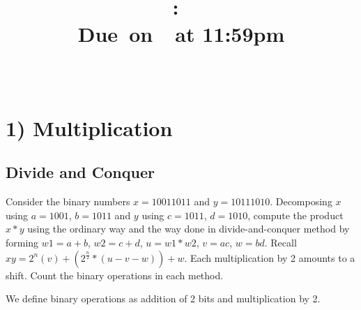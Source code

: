\documentclass{article}
\title{
    \vspace{2in}
    \textmd{\textbf{\hmwkClass:\ \hmwkTitle}}\\
    \normalsize\vspace{0.1in}\small{Due\ on\ \hmwkDueDate\ at 11:59pm}\\
    \vspace{0.1in}\large{\textit{\hmwkClassInstructor\ \hmwkClassTime}}
    \vspace{3in}
}
\author{\hmwkAuthorName}
\date{}
\begin{document}
\maketitle

\pagebreak

\section*{1) Multiplication}
\subsection*{Divide and Conquer}
Consider the binary numbers $x = 10011011$ and $y = 10111010$. Decomposing $x$ using $a = 1001$, $b = 1011$
and $y$ using $c = 1011$, $d = 1010$, compute the product $x*y$ using the ordinary way and the way done in
divide-and-conquer method by forming $w1 = a + b$, $w2 = c + d$, $u = w1*w2$, $v = ac$, $w = bd$. Recall $xy =
2^n(v) + (2^{\frac{n}{2}}* (u-v-w)) + w$. Each multiplication by 2 amounts to a shift. Count the binary operations in
each method.


We define binary operations as addition of 2 bits and multiplication by 2. \\
\end{document}
